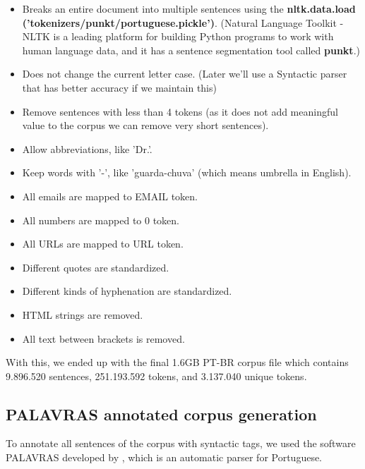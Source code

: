 \begin{itemize}
    \item Breaks an entire document into multiple sentences using the 
    \textbf{nltk.data.load ('tokenizers/punkt/portuguese.pickle')}. (Natural Language Toolkit - NLTK is a leading platform for building Python programs to work with human language data, and it has a sentence segmentation tool called \textbf{punkt}.)
    \item Does not change the current letter case. (Later we'll use a Syntactic parser that has better accuracy if we maintain this)
    \item Remove sentences with less than 4 tokens (as it does not add meaningful value to the corpus we can remove very short sentences).
    \item Allow abbreviations, like 'Dr.'.
    \item Keep words with '-', like 'guarda-chuva' (which means umbrella in English).
    \item All emails are mapped to EMAIL token.
    \item All numbers are mapped to 0 token.
    \item All URLs are mapped to URL token.
    \item Different quotes are standardized.
    \item Different kinds of hyphenation are standardized.
    \item HTML strings are removed.
    \item All text between brackets is removed.
\end{itemize}

With this, we ended up with the final 1.6GB PT-BR corpus file which contains 9.896.520 sentences, 251.193.592 tokens, and 3.137.040 unique tokens.


\subsection{PALAVRAS annotated corpus generation}\label{chap:methodsandmaterials:palavras}

To annotate all sentences of the corpus with syntactic tags, we used the software PALAVRAS developed by , which is an automatic parser for Portuguese.

